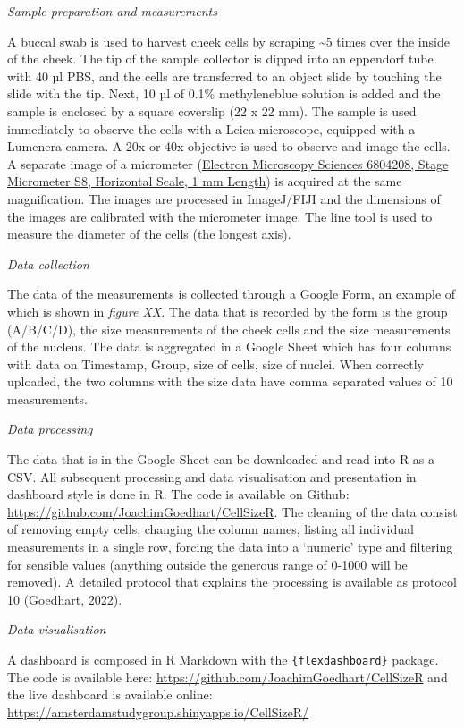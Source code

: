 \documentclass[
]{agujournal2019}
\begin{document}
\emph{Sample preparation and measurements}

A buccal swab is used to harvest cheek cells by scraping
\textasciitilde5 times over the inside of the cheek. The tip of the
sample collector is dipped into an eppendorf tube with 40 µl PBS, and
the cells are transferred to an object slide by touching the slide with
the tip. Next, 10 µl of 0.1\% methyleneblue solution is added and the
sample is enclosed by a square coverslip (22 x 22 mm). The sample is
used immediately to observe the cells with a Leica microscope, equipped
with a Lumenera camera. A 20x or 40x objective is used to observe and
image the cells. A separate image of a micrometer
(\href{https://www.fishersci.com/shop/products/stage-graticules-s8/5028481}{Electron
Microscopy Sciences 6804208, Stage Micrometer S8, Horizontal Scale, 1 mm
Length}) is acquired at the same magnification. The images are processed
in ImageJ/FIJI and the dimensions of the images are calibrated with the
micrometer image. The line tool is used to measure the diameter of the
cells (the longest axis).

\emph{Data collection}

The data of the measurements is collected through a Google Form, an
example of which is shown in \emph{figure XX}. The data that is recorded
by the form is the group (A/B/C/D), the size measurements of the cheek
cells and the size measurements of the nucleus. The data is aggregated
in a Google Sheet which has four columns with data on Timestamp, Group,
size of cells, size of nuclei. When correctly uploaded, the two columns
with the size data have comma separated values of 10 measurements.

\emph{Data processing}

The data that is in the Google Sheet can be downloaded and read into R
as a CSV. All subsequent processing and data visualisation and
presentation in dashboard style is done in R. The code is available on
Github: \url{https://github.com/JoachimGoedhart/CellSizeR}. The cleaning
of the data consist of removing empty cells, changing the column names,
listing all individual measurements in a single row, forcing the data
into a `numeric' type and filtering for sensible values (anything
outside the generous range of 0-1000 will be removed). A detailed
protocol that explains the processing is available as protocol 10
(Goedhart, 2022).

\emph{Data visualisation}

A dashboard is composed in R Markdown with the
\texttt{\{flexdashboard\}} package. The code is available here:
\url{https://github.com/JoachimGoedhart/CellSizeR} and the live
dashboard is available online:
\url{https://amsterdamstudygroup.shinyapps.io/CellSizeR/}
\end{document}
